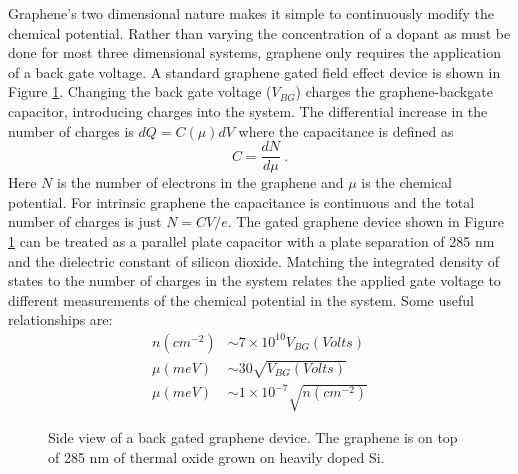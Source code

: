 Graphene's two dimensional nature makes it simple to continuously modify the chemical potential.
Rather than varying the concentration of a dopant as must be done for most three dimensional systems, graphene only requires the application of a back gate voltage.
A standard graphene gated field effect device is shown in Figure \ref{fig:kek:FET}.
Changing the back gate voltage ($V_{BG}$) charges the graphene-backgate capacitor, introducing charges into the system.
The differential increase in the number of charges is $dQ=C(\mu) dV$ where the capacitance is defined as
\begin{equation*}
	C=\frac{d N}{d \mu} \ .
\end{equation*}
Here $N$ is the number of electrons in the graphene and $\mu$ is the chemical potential.
For intrinsic graphene the capacitance is continuous and the total number of charges is just $N=CV/e$.
The gated graphene device shown in Figure \ref{fig:kek:FET} can be treated as a parallel plate capacitor with a plate separation of 285 nm and the dielectric constant of silicon dioxide.
Matching the integrated density of states to the number of charges in the system relates the applied gate voltage to different measurements of the chemical potential in the system.
Some useful relationships are:
\begin{align*}
	n(cm^{-2})&\sim 7 \times 10^{10} V_{BG} (Volts) \\
	\mu(meV) &\sim 30 \sqrt{V_{BG} (Volts)} \\
	\mu(meV) &\sim 1 \times 10^{-7} \sqrt{n(cm^{-2})}
\end{align*}

\begin{figure}
	\begin{center}
	
	\end{center}
	\caption[Side view of a back gated graphene device.]{\label{fig:kek:FET} Side view of a back gated graphene device.  The graphene is on top of 285 nm of thermal oxide grown on heavily doped Si. }	
\end{figure}
